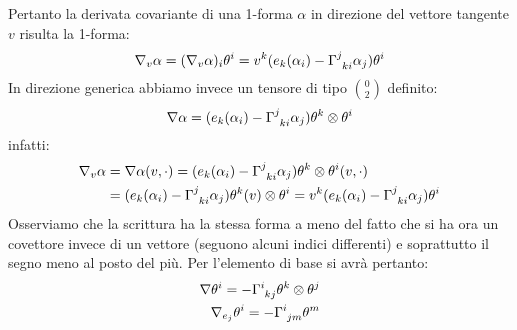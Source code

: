 Pertanto la derivata covariante di una 1-forma $\alpha$ in direzione del vettore tangente $v$ risulta la 1-forma:
\begin{equation*}
    \nabla_v \alpha = (\nabla_v \alpha)_i\theta^i = v^k(e_k(\alpha_i) -\tensor{\Gamma}{^j_{ki}}\alpha_j)\theta^i
\end{equation*}
In direzione generica abbiamo invece un tensore di tipo $\binom{0}{2}$ definito:
\begin{equation*}
    \nabla \alpha = (e_k(\alpha_i) -\tensor{\Gamma}{^j_{ki}}\alpha_j)\theta^k \otimes \theta^i
\end{equation*}
infatti:
\begin{align*}
    \nabla_v \alpha &= \nabla \alpha (v, \cdot ) = (e_k(\alpha_i) -\tensor{\Gamma}{^j_{ki}}\alpha_j)\theta^k \otimes \theta^i (v, \cdot) \\
    &= (e_k(\alpha_i) -\tensor{\Gamma}{^j_{ki}}\alpha_j)\theta^k(v) \otimes \theta^i =v^k(e_k(\alpha_i) -\tensor{\Gamma}{^j_{ki}}\alpha_j)\theta^i
\end{align*}
Osserviamo che la scrittura ha la stessa forma a meno del fatto che si ha ora un covettore invece di un vettore (seguono alcuni indici differenti) e soprattutto il segno meno al posto del più.
Per l'elemento di base si avrà pertanto:
\begin{align}
    \nabla \theta^i = -\tensor{\Gamma}{^i_{kj}}\theta^k \otimes \theta^j \\
    \nabla_{e_j} \theta^i = -\tensor{\Gamma}{^i_{jm}}\theta^m
\end{align}


